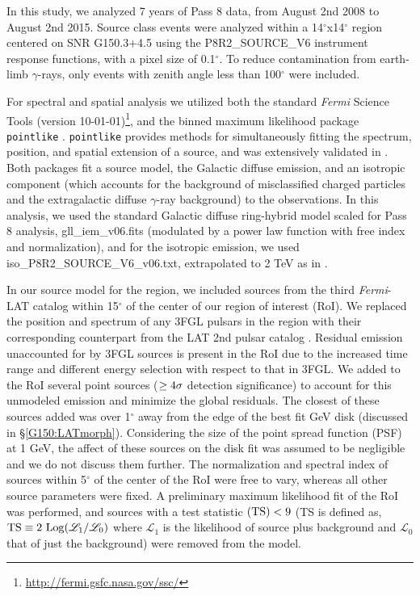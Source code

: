 \documentclass[iop]{emulateapj}
\newcommand{\kibitz}[2]{\ifnum\Comments=1\textcolor{#1}{#2}\fi}
\newcommand{\jamie}[1]{\kibitz{red}      {[JAM: #1]}}
\newcommand{\gam}{$\gamma$-ray}
\newcommand{\Fermi}{\emph{Fermi}}  %
\newcommand{\FermiLat}{\emph{Fermi}-LAT }     %
\newcommand{\ptlike}{{\tt pointlike}}
\newcommand{\Gone}{G150.3+4.5}
\begin{document}
In this study, we  analyzed 7 years of Pass 8 data, from August 2nd 2008  to August 2nd 2015. Source class events were analyzed within a 14$^\circ$x14$^\circ$ region centered on SNR \Gone{} using the P8R2\_SOURCE\_V6 instrument response functions, with a pixel size of 0.1$^{\circ}$. To reduce contamination from earth-limb \gam{}s, only events with zenith angle less than 100$^{\circ}$ were included.

For spectral and spatial analysis we utilized both the standard \Fermi{} Science Tools (version 10-01-01)\footnote[1]{\url{http://fermi.gsfc.nasa.gov/ssc/}}, and the binned maximum likelihood package \ptlike{} \citep{Kerr10}. \ptlike{} provides methods for simultaneously fitting the spectrum, position, and spatial extension of a source, and was extensively validated in \cite{Lande12}. Both packages fit a source model, the Galactic diffuse emission, and an isotropic component (which accounts for the background of misclassified charged particles and the extragalactic diffuse \gam{} background) %
 to the observations. In this analysis, we used the standard Galactic diffuse ring-hybrid model scaled for Pass 8 analysis, gll{\_}iem{\_}v06.fits (modulated by a power law function with free index and normalization), and for the isotropic emission,  we used iso{\_}P8R2{\_}SOURCE{\_}V6{\_}v06.txt, extrapolated to 2 TeV as in \cite{2FHL}.

In our source model for the region, we included sources from the third \FermiLat{} catalog \citep[3FGL]{3FGL} within 15$^\circ$ of the center of our region of interest (RoI). We replaced the position and spectrum of any 3FGL pulsars in the region with their corresponding counterpart  from the LAT 2nd pulsar catalog \citep{2PC}.  Residual emission unaccounted for by 3FGL sources is present in the RoI due to the increased time range and different energy selection with respect to that in 3FGL. We added to the RoI several  point sources (${\rm  \geq 4\sigma}$ detection significance) to account for this unmodeled emission and minimize the global residuals. The closest of these sources added was over 1$^{\circ}$ away from the edge of the best fit GeV disk (discussed in \S \ref{G150:LATmorph}). Considering the size of the point spread function (PSF) at 1 GeV, the affect of these sources on the disk fit was assumed to be  negligible and we do not discuss them further.  The normalization and spectral index of sources within 5$^{\circ}$ of the center of the RoI were free to vary, whereas all other source parameters were fixed. A preliminary maximum likelihood fit of the RoI was performed, and  sources with a test statistic ${\rm (TS) <  9}$ (TS is defined as,  ${\rm TS}\equiv 2~{\rm Log}(\mathcal{L}_1 / \mathcal{L}_0)$ where $\mathcal{L}_1$ 
is the likelihood of source plus background and  $\mathcal{L}_0$ that of just the background) were removed from the model. 
\end{document}
